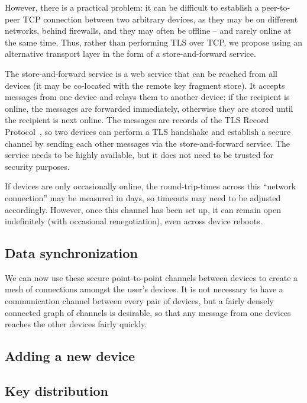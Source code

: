 However, there is a practical problem: it can be difficult to establish a peer-to-peer TCP
connection between two arbitrary devices, as they may be on different networks, behind firewalls,
and they may often be offline -- and rarely online at the same time. Thus, rather than performing
TLS over TCP, we propose using an alternative transport layer in the form of a store-and-forward
service.

The store-and-forward service is a web service that can be reached from all devices (it may be
co-located with the remote key fragment store). It accepts messages from one device and relays them
to another device: if the recipient is online, the messages are forwarded immediately, otherwise
they are stored until the recipient is next online. The messages are records of the TLS Record
Protocol~\cite{TLS}, so two devices can perform a TLS handshake and establish a secure channel by
sending each other messages via the store-and-forward service. The service needs to be highly
available, but it does not need to be trusted for security purposes.

If devices are only occasionally online, the round-trip-times across this ``network connection'' may
be measured in days, so timeouts may need to be adjusted accordingly. However, once this channel has
been set up, it can remain open indefinitely (with occasional renegotiation), even across device
reboots.

\subsection{Data synchronization}\label{sec:devicesync}

We can now use these secure point-to-point channels between devices to create a mesh of connections
amongst the user's devices. It is not necessary to have a communication channel between every pair
of devices, but a fairly densely connected graph of channels is desirable, so that any message from
one devices reaches the other devices fairly quickly.

\subsection{Adding a new device}\label{sec:newdevice}

\subsection{Key distribution}

